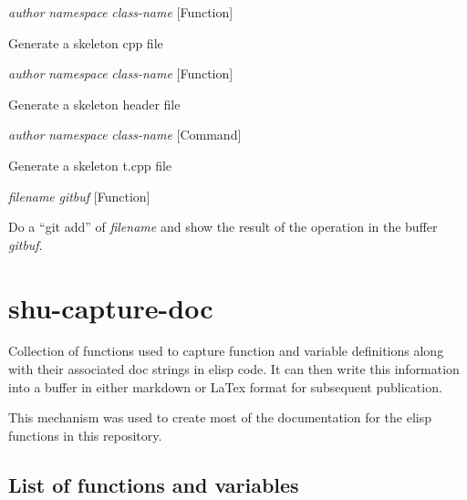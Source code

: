 \vspace{1em}
\noindent
{}
\usebox{\funcname}\emph{author} \emph{namespace} \emph{class-name}
 \hfill [Function]

\begin{doc-string}
Generate a skeleton cpp file
\end{doc-string}

\vspace{1em}
\noindent
{}
\usebox{\funcname}\emph{author} \emph{namespace} \emph{class-name}
 \hfill [Function]

\begin{doc-string}
Generate a skeleton header file
\end{doc-string}

\vspace{1em}
\noindent
{}
\usebox{\funcname}\emph{author} \emph{namespace} \emph{class-name}
 \hfill [Command]

\begin{doc-string}
Generate a skeleton t.cpp file
\end{doc-string}

\vspace{1em}
\noindent
{}
\usebox{\funcname}\emph{filename} \emph{gitbuf}
 \hfill [Function]

\begin{doc-string}
Do a ``git add'' of \emph{filename} and show the result of the operation in
the buffer \emph{gitbuf}.
\end{doc-string}

\eject
\section{shu-capture-doc}


Collection of functions used to capture function and variable definitions
along with their associated doc strings in elisp code.  It can then write
this information into a buffer in either markdown or LaTex format for
subsequent publication.

This mechanism was used to create most of the documentation for the elisp
functions in this repository.


\subsection{List of functions and variables}

